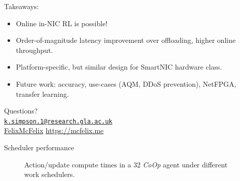 \documentclass[aspectratio=169,xcolor={dvipsnames}
]{beamer}
\newcommand{\Coopfw}{\emph{CoOp}}
\begin{document}
\begin{frame}[standout]
	Takeaways:
	\begin{itemize}
		\item \alert{Online in-NIC RL is possible!}
		\item \alert{Order-of-magnitude latency improvement} over offloading, higher online throughput.
		\item Platform-specific, but similar design for SmartNIC hardware class.
		\item \alert{Future work}: accuracy, use-cases (AQM, DDoS prevention), NetFPGA, transfer learning.
	\end{itemize}
	\alert{Questions?}\\
	{
		\scriptsize
		\vspace{2em}\faEnvelopeO{} \href{mailto:k.simpson.1@research.gla.ac.uk}{\nolinkurl{k.simpson.1@research.gla.ac.uk}}\\
		\vspace{-0.8em}	\small{\faGithub{} \href{https://github.com/felixmcfelix}{FelixMcFelix} \hspace{0.5em} \faGlobe{} \url{https://mcfelix.me}}
	}
\end{frame}

\appendix

\begin{frame}{Scheduler performance}
	\begin{figure}
		\caption{Action/update compute times in a \SI{32}{\bit} \Coopfw{} agent under different work schedulers.\label{fig:work-alloc-32}}
	\end{figure}
\end{frame}
\end{document}
